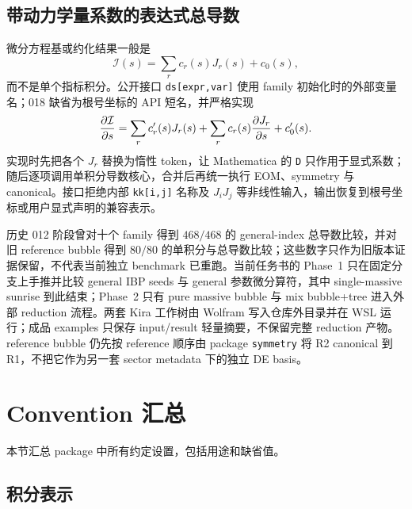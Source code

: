 ﻿\documentclass[a4paper,11pt]{article}
\begin{document}
\subsection{带动力学量系数的表达式总导数}

微分方程基或约化结果一般是
\begin{equation}
  \mathcal I(s)=\sum_r c_r(s)J_r(s)+c_0(s),
\end{equation}
而不是单个指标积分。公开接口 \verb|ds[expr,var]| 使用 family 初始化时的外部变量名；018 缺省为根号坐标的 API 短名，并严格实现
\begin{equation}
  {\partial\mathcal I\over\partial s}
  =\sum_r c'_r(s)J_r(s)
  +\sum_r c_r(s){\partial J_r\over\partial s}
  +c'_0(s).
  \label{expressionTotalDerivative}
\end{equation}
实现时先把各个 $J_r$ 替换为惰性 token，让 Mathematica 的 \texttt{D} 只作用于显式系数；随后逐项调用单积分导数核心，合并后再统一执行 EOM、symmetry 与 canonical。接口拒绝内部 \texttt{kk[i,j]} 名称及 $J_iJ_j$ 等非线性输入，输出恢复到根号坐标或用户显式声明的兼容表示。

历史 012 阶段曾对十个 family 得到 $468/468$ 的 general-index 总导数比较，并对旧 reference bubble 得到 $80/80$ 的单积分与总导数比较；这些数字只作为旧版本证据保留，不代表当前独立 benchmark 已重跑。当前任务书的 Phase~1 只在固定分支上手推并比较 general IBP seeds 与 general 参数微分算符，其中 single-massive sunrise 到此结束；Phase~2 只有 pure massive bubble 与 mix bubble+tree 进入外部 reduction 流程。两套 Kira 工作树由 Wolfram 写入仓库外目录并在 WSL 运行；成品 examples 只保存 input/result 轻量摘要，不保留完整 reduction 产物。reference bubble 仍先按 reference 顺序由 package \texttt{symmetry} 将 R2 canonical 到 R1，不把它作为另一套 sector metadata 下的独立 DE basis。

\section{Convention 汇总}

本节汇总 package 中所有约定设置，包括用途和缺省值。

\subsection{积分表示}
\end{document}
